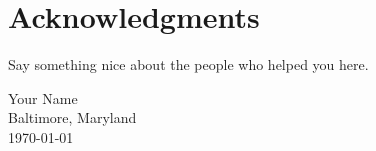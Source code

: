 \chapter*{Acknowledgments}
\label{acks}

Say something nice about the people who helped you here.

\begin{singlespace}
\begin{flushright}
Your Name\\
Baltimore, Maryland \\
\today
\end{flushright}
\end{singlespace}


